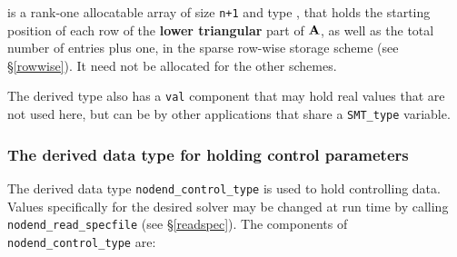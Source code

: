 \documentclass{galahad}
\newcommand{\packagename}{nodend}
\begin{document}
\begin{description}
 is a rank-one allocatable array of size {\tt n+1} and type
\integer, that holds the starting position of
each row of the {\bf lower triangular} part of ${\mathbf{A}}$, as well
as the total number of entries plus one, in the sparse row-wise storage
scheme (see \S\ref{rowwise}). It need not be allocated for the
other schemes.

\end{description}
The derived type also has a {\tt val} component that may hold real values
that are not used here, but can be by other applications that share
a {\tt SMT\_type} variable.


\subsubsection{The derived data type for holding control
 parameters}\label{typecontrol}
The derived data type
{\tt \packagename\_control\_type}
is used to hold controlling data. Values specifically for the desired solver
may be changed at run time by calling
{\tt \packagename\_read\-\_specfile}
(see \S\ref{readspec}).
The components of
{\tt \packagename\_control\_type}
are:
\end{document}
